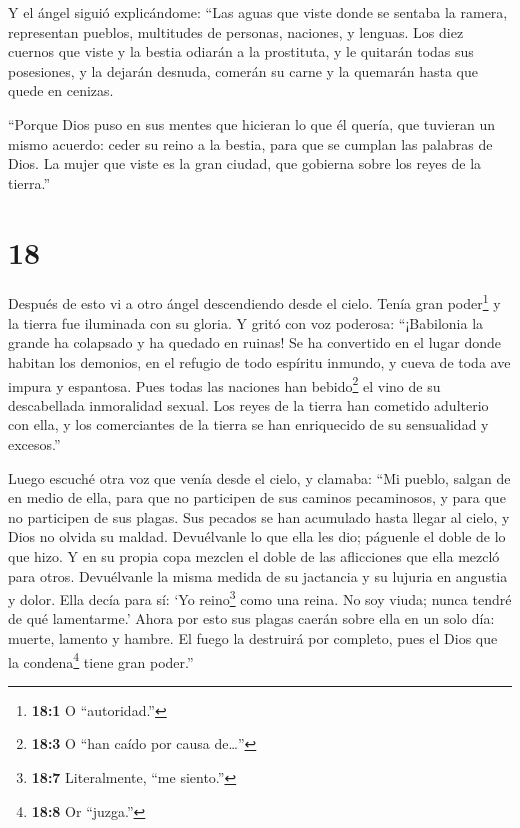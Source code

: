  Y el ángel siguió explicándome: ``Las aguas que viste
donde se sentaba la ramera, representan pueblos, multitudes de personas,
naciones, y lenguas.  Los diez cuernos que viste y la
bestia odiarán a la prostituta, y le quitarán todas sus posesiones, y la
dejarán desnuda, comerán su carne y la quemarán hasta que quede en
cenizas.

 ``Porque Dios puso en sus mentes que hicieran lo que él
quería, que tuvieran un mismo acuerdo: ceder su reino a la bestia, para
que se cumplan las palabras de Dios.  La mujer que viste es
la gran ciudad, que gobierna sobre los reyes de la tierra.''

\hypertarget{section-17}{%
\section{18}\label{section-17}}

 Después de esto vi a otro ángel descendiendo desde el
cielo. Tenía gran poder\footnote{\textbf{18:1} O ``autoridad.''} y la
tierra fue iluminada con su gloria.  Y gritó con voz
poderosa: ``¡Babilonia la grande ha colapsado y ha quedado en ruinas! Se
ha convertido en el lugar donde habitan los demonios, en el refugio de
todo espíritu inmundo, y cueva de toda ave impura y espantosa.
 Pues todas las naciones han bebido\footnote{\textbf{18:3} O
  ``han caído por causa de\ldots''} el vino de su descabellada
inmoralidad sexual. Los reyes de la tierra han cometido adulterio con
ella, y los comerciantes de la tierra se han enriquecido de su
sensualidad y excesos.''

 Luego escuché otra voz que venía desde el cielo, y clamaba:
``Mi pueblo, salgan de en medio de ella, para que no participen de sus
caminos pecaminosos, y para que no participen de sus plagas.
 Sus pecados se han acumulado hasta llegar al cielo, y Dios
no olvida su maldad.  Devuélvanle lo que ella les dio;
páguenle el doble de lo que hizo. Y en su propia copa mezclen el doble
de las aflicciones que ella mezcló para otros.  Devuélvanle
la misma medida de su jactancia y su lujuria en angustia y dolor. Ella
decía para sí: `Yo reino\footnote{\textbf{18:7} Literalmente, ``me
  siento.''} como una reina. No soy viuda; nunca tendré de qué
lamentarme.'  Ahora por esto sus plagas caerán sobre ella en
un solo día: muerte, lamento y hambre. El fuego la destruirá por
completo, pues el Dios que la condena\footnote{\textbf{18:8} Or
  ``juzga.''} tiene gran poder.''

